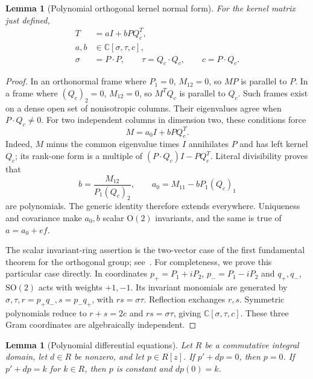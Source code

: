 \documentclass[11pt]{article}
\newtheorem{lemma}[theorem]{Lemma}
\theoremstyle{definition}
\theoremstyle{plain}
\numberwithin{equation}{section}
\begin{document}
\begin{lemma}[Polynomial orthogonal kernel normal form]\label{lem:matrix}
For the kernel matrix just defined,
\begin{equation}
 \begin{aligned}
 T&=aI+bPQ_c^T,\\
 a,b&\in\mathbb C[\sigma,\tau,c],\\
 \sigma&=P\cdot P,\qquad \tau=Q_c\cdot Q_c,\qquad c=P\cdot Q_c.
 \end{aligned}
 \tag{9}\label{eq:normalform}
\end{equation}
\end{lemma}

\begin{proof}
In an orthonormal frame where \(P_1=0\), \(M_{12}=0\), so \(MP\) is parallel
to \(P\). In a frame where \((Q_c)_2=0\), \(M_{12}=0\), so \(M^TQ_c\) is
parallel to \(Q_c\). Such frames exist on a dense open set of nonisotropic
columns. Their eigenvalues agree when \(P\cdot Q_c\ne0\). For two independent
columns in dimension two, these conditions force
\[
 M=a_0I+bPQ_c^T.
\]
Indeed, \(M\) minus the common eigenvalue times \(I\) annihilates \(P\) and
has left kernel \(Q_c\); its rank-one form is a multiple of
\((P\cdot Q_c)I-PQ_c^T\). Literal divisibility proves that
\[
 b=\frac{M_{12}}{P_1(Q_c)_2},\qquad a_0=M_{11}-bP_1(Q_c)_1
\]
are polynomials. The generic identity therefore extends everywhere.
Uniqueness and covariance make \(a_0,b\) scalar \(\mathrm O(2)\) invariants,
and the same is true of \(a=a_0+ef\).

The scalar invariant-ring assertion is the two-vector case of the first
fundamental theorem for the orthogonal group; see~\cite[Section~10.2(a)]{kraft}.
For completeness, we prove this particular case directly. In coordinates
\(p_+=P_1+iP_2\), \(p_-=P_1-iP_2\) and \(q_+,q_-\),
\(\mathrm{SO}(2)\) acts with weights \(+1,-1\). Its invariant monomials
are generated by \(\sigma,\tau,r=p_+q_-,s=p_-q_+\), with
\(rs=\sigma\tau\). Reflection exchanges \(r,s\). Symmetric polynomials
reduce to \(r+s=2c\) and \(rs=\sigma\tau\), giving
\(\mathbb C[\sigma,\tau,c]\). These three Gram coordinates are algebraically
independent.
\end{proof}

\begin{lemma}[Polynomial differential equations]\label{lem:ode}
Let \(R\) be a commutative integral domain, let \(d\in R\) be nonzero,
and let \(p\in R[z]\). If \(p'+dp=0\), then \(p=0\). If
\(p'+dp=k\) for \(k\in R\), then \(p\) is constant and \(dp(0)=k\).
\end{lemma}
\end{document}
